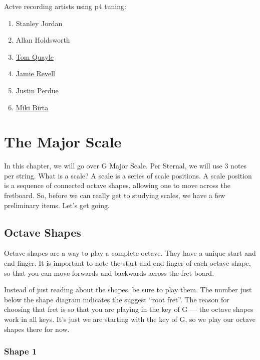 \documentclass[12pt]{report}
\begin{document}
Actve recording artists using p4 tuning:

\begin{enumerate}
\item Stanley Jordan
\item Allan Holdsworth
\item \href{http://www.youtube.com/user/tq105}{Tom Quayle}
\item \href{http://www.jamierevell.co.uk/}{Jamie Revell}
\item \href{http://justinperdue.com/}{Justin Perdue}
\item \href{http://www.youtube.com/user/mikibirta}{Miki Birta}
\end{enumerate}


\chapter{The Major Scale}

In this chapter, we will go over G Major Scale. Per Sternal, we will use 3
notes per string. What is a scale? A scale is a series of scale
positions. A scale position is a sequence of connected octave
shapes, allowing one to move across the fretboard. So, before we can
really get to studying scales, we have a few preliminary items. Let's
get going.

\section{Octave Shapes}

Octave shapes are a way to play a complete octave. They have a unique
start and end finger. It is important to note the start and end finger
of each octave shape, so that you can move forwards and backwards
across the fret board.

Instead of just reading about the shapes, be sure to play them. The
number just below the shape diagram indicates the suggest ``root
fret''. The reason for choosing that fret is so that you are playing
in the key of G --- the octave shapes work in all keys. It's just we
are starting with the key of G, so we play our octave shapes there for
now. 

\subsection{Shape 1}
\begin{sideways}
  \def\numfrets{10}
\end{sideways}
\end{document}
